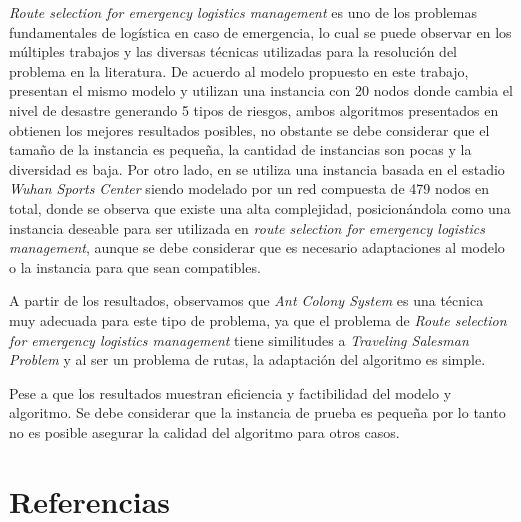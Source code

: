 \documentclass{llncs}
\begin{document}
\textit{Route selection for emergency logistics management} es uno de los problemas fundamentales de logística en caso de emergencia, lo cual se puede observar en los múltiples trabajos y las diversas técnicas utilizadas para la resolución del problema en la literatura. De acuerdo al modelo propuesto en este trabajo, \cite{Yuan20091081,zhang2013route} presentan el mismo modelo y utilizan una instancia con 20 nodos donde cambia el nivel de desastre generando 5 tipos de riesgos, ambos algoritmos presentados en \cite{Yuan20091081,zhang2013route} obtienen los mejores resultados posibles, no obstante se debe considerar que el tamaño de la instancia es pequeña, la cantidad de instancias son pocas y la diversidad es baja. Por otro lado, en  \cite{zong2010multi,zong2010multiflow,zong2014conflict} se utiliza una instancia basada en el estadio \textit{Wuhan Sports Center} siendo modelado por un red compuesta de  479 nodos en total, donde se observa que existe una alta complejidad, posicionándola como una instancia deseable para ser utilizada en \textit{route selection for emergency logistics management}, aunque se debe considerar que es necesario adaptaciones al modelo o la instancia para que sean compatibles.

A partir de los resultados, observamos que \textit{Ant Colony System} es una técnica muy adecuada para este tipo de problema, ya que el problema de \textit{Route selection for emergency logistics management} tiene similitudes a  \textit{Traveling Salesman Problem} y al ser un problema de rutas, la adaptación del algoritmo es simple. 

Pese a que los resultados muestran eficiencia y factibilidad del modelo y algoritmo. Se debe considerar que la instancia de prueba es pequeña por lo tanto no es posible asegurar la calidad del algoritmo para otros casos.


\section{Referencias}
\begingroup
\renewcommand{\section}[2]{}%

\endgroup


\end{document}
